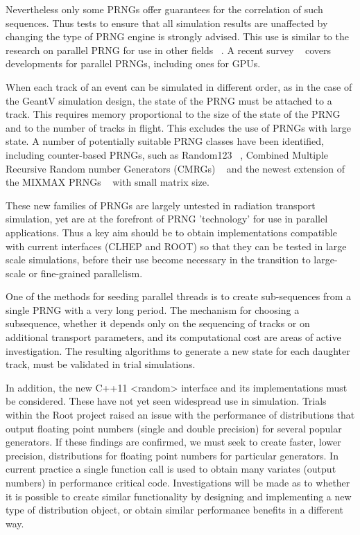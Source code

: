 \documentclass[12pt,a4paper]{article}
\begin{document}
{Nevertheless only some PRNGs offer guarantees for the correlation of
such sequences. Thus tests to ensure that all simulation results are
unaffected by changing the type of PRNG engine is strongly advised. This
use is similar to the research on parallel PRNG for use in other fields
~\cite{PhysRevE.75.066701}. A recent survey ~\cite{lecuyer:hal-01399537} covers 
developments for parallel PRNGs, including ones for GPUs.

When each track of an event can be simulated in different order, as in
the case of the GeantV simulation design, the state of the PRNG must be
attached to a track. This requires memory proportional to the size of
the state of the PRNG and to the number of tracks in flight. This
excludes the use of PRNGs with large state. A number of potentially
suitable PRNG classes have been identified, including counter-based
PRNGs, such as Random123 ~\cite{Salmon:2011:PRN:2063384.2063405}, 
Combined Multiple Recursive Random number Generators (CMRGs) 
~\cite{doi:10.1287/opre.47.1.159} and the newest extension of the
MIXMAX PRNGs ~\cite{Savvidy:2015jva} with small matrix size.

These new families of PRNGs are largely untested in radiation transport
simulation, yet are at the forefront of PRNG 'technology' for use in
parallel applications. Thus a key aim should be to obtain
implementations compatible with current interfaces (CLHEP and ROOT) so
that they can be tested in large scale simulations, before their use
become necessary in the transition to large-scale or fine-grained
parallelism.

One of the methods for seeding parallel threads is to create
sub-sequences from a single PRNG with a very long period. The mechanism
for choosing a subsequence, whether it depends only on the sequencing of
tracks or on additional transport parameters, and its computational cost
are areas of active investigation. The resulting algorithms to generate
a new state for each daughter track, must be validated in trial
simulations.

In addition, the new C++11 \textless{}random\textgreater{} interface and
its implementations must be considered. These have not yet seen
widespread use in simulation. Trials within the Root project raised an
issue with the performance of distributions that output floating point
numbers (single and double precision) for several popular generators. If
these findings are confirmed, we must seek to create faster, lower
precision, distributions for floating point numbers for particular
generators. In current practice a single function call is used to obtain
many variates (output numbers) in performance critical code.
Investigations will be made as to whether it is possible to create
similar functionality by designing and implementing a new type of
distribution object, or obtain similar performance benefits in a
different way.

}
\end{document}
